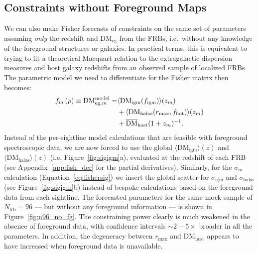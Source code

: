 \documentclass[twocolumn]{aastex63}
\newcommand{\dmhalo}{\ensuremath{\mathrm{DM}_\mathrm{halos}}}
\newcommand{\dmigm}{\ensuremath{\mathrm{DM}_\mathrm{igm}}}
\newcommand{\dmhost}{\ensuremath{\mathrm{DM}_\mathrm{host}}}
\newcommand{\bardmhost}{\ensuremath{\overline{\mathrm{DM}}_\mathrm{host}}}
\newcommand{\sigigm}{\ensuremath{\sigma_\mathrm{igm}}}
\newcommand{\sighalo}{\ensuremath{\sigma_\mathrm{halos}}}
\newcommand{\figm}{\ensuremath{f_\mathrm{igm}}}
\newcommand{\fhot}{\ensuremath{f_\mathrm{hot}}}
\newcommand{\rmax}{\ensuremath{r_\mathrm{max}}}
\newcommand{\nfrb}{\ensuremath{N_\mathrm{frb}}}
\begin{document}
\begin{CJK*}{UTF8}{gbsn}
\subsection{Constraints without Foreground Maps}

We can also make Fisher forecasts of constraints on the same set of parameters assuming \textit{only} the redshift and $\mathrm{DM_{eg}}$ from the FRBs, i.e.\ without
any knowledge of the foreground structures or galaxies. In practical terms, this is equivalent
to {trying to fit a theoretical Macquart relation to the extragalactic dispersion measures and host galaxy redshifts from an observed sample of  
localized FRBs. }
The parametric model we need to differentiate for the Fisher matrix then becomes:
\begin{align}
\label{eq:obs_no_fg}
f_m\left(p\right) \equiv {\rm DM}^\mathrm{model}_{\mathrm{eg},m} =& \langle {\rm DM}_\mathrm{igm}(\figm) \rangle (z_m) \nonumber \\ &+ \langle \mathrm{DM}_\mathrm{halos}(\rmax, \fhot) \rangle (z_m) \nonumber \\ &+ \bardmhost(1+z_m)^{-1}.
\end{align}
Instead of the per-sightline model calculations that are feasible with foreground spectroscopic data, we are now forced to use the global $\langle \dmigm \rangle(z)$ and 
$\langle \dmhalo \rangle (z)$ (i.e. Figure~\ref{fig:sigigm}a), evaluated at the redshift of each FRB (see Appendix~\ref{app:fish_der} for the partial derivatives). Similarly, for the $\sigma_m$ calculation (Equation~\ref{eq:fishersig}) we insert the
global scatter for $\sigigm$ and $\sighalo$ (see Figure~\ref{fig:sigigm}b) instead of 
bespoke calculations based on the foreground data from each sightline. 
The forecasted parameters for the same mock sample of $\nfrb = 96$ --- but without any foreground
information --- is shown in Figure~\ref{fig:n96_no_fg}. The constraining power clearly is much weakened in the 
absence of foreground data, with confidence intervals $\sim 2-5\times$ broader
in all the parameters. In addition, the degeneracy between $\rmax$ and \dmhost{} appears to have increased when foreground data is unavailable.


\end{CJK*}
\end{document}
